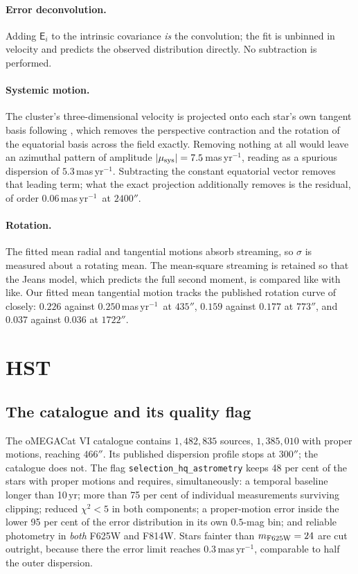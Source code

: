 \documentclass[11pt,a4paper]{article}
\newcommand{\masyr}{mas\,yr$^{-1}$}
\begin{document}
\paragraph{Error deconvolution.} Adding $\mathsf{E}_i$ to the intrinsic covariance
\emph{is} the convolution; the fit is unbinned in velocity and predicts the observed
distribution directly. No subtraction is performed.

\paragraph{Systemic motion.} The cluster's three-dimensional velocity is projected onto each
star's own tangent basis following \citet[\S5.1]{vasiliev2020}, which removes the perspective
contraction and the rotation of the equatorial basis across the field exactly. Removing
nothing at all would leave an azimuthal pattern of amplitude $|\mu_{\rm sys}|=7.5$\,\masyr,
reading as a spurious dispersion of $5.3$\,\masyr. Subtracting the constant equatorial vector
removes that leading term; what the exact projection additionally removes is the residual,
of order $0.06$\,\masyr\ at $2400''$.

\paragraph{Rotation.} The fitted mean radial and tangential motions absorb streaming, so
$\sigma$ is measured about a rotating mean. The mean-square streaming is retained so that the
Jeans model, which predicts the full second moment, is compared like with like. Our fitted
mean tangential motion tracks the published rotation curve of \citet{vasiliev2021} closely:
$0.226$ against $0.250$\,\masyr\ at $435''$, $0.159$ against $0.177$ at $773''$, and $0.037$
against $0.036$ at $1722''$.

\section{HST}

\subsection{The catalogue and its quality flag}

The oMEGACat VI catalogue contains $1{,}482{,}835$ sources, $1{,}385{,}010$ with proper
motions, reaching $466''$. Its published dispersion profile stops at $300''$; the catalogue
does not. The flag \texttt{selection\_hq\_astrometry} keeps 48 per cent of the stars with
proper motions and requires, simultaneously: a temporal baseline longer than 10\,yr; more
than 75 per cent of individual measurements surviving clipping; reduced $\chi^2<5$ in both
components; a proper-motion error inside the lower 95 per cent of the error distribution in
its own $0.5$-mag bin; and reliable photometry in \emph{both} F625W and F814W. Stars fainter
than $m_{\rm F625W}=24$ are cut outright, because there the error limit reaches
$0.3$\,\masyr, comparable to half the outer dispersion.
\end{document}
